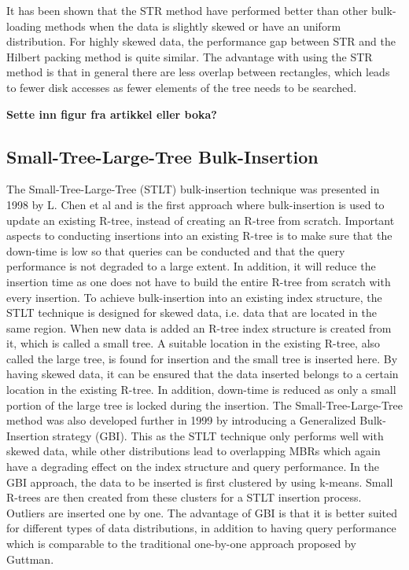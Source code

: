 It has been shown that the STR method have performed better than other bulk-loading methods when the data is slightly skewed or have an uniform distribution. For highly skewed data, the performance gap between STR and the Hilbert packing method is quite similar\cite{STR}. The advantage with using the STR method is that in general there are less overlap between rectangles, which leads to fewer disk accesses as fewer elements of the tree needs to be searched.

\textbf{Sette inn figur fra artikkel eller boka?}

\subsection{Small-Tree-Large-Tree Bulk-Insertion}
The Small-Tree-Large-Tree (STLT) bulk-insertion technique was presented in 1998 by L. Chen et al\cite{STLT} and is the first approach where bulk-insertion is used to update an existing R-tree, instead of creating an R-tree from scratch. Important aspects to conducting insertions into an existing R-tree is to make sure that the down-time is low so that queries can be conducted and that the query performance is not degraded to a large extent. In addition, it will reduce the insertion time as one does not have to build the entire R-tree from scratch with every insertion. To achieve bulk-insertion into an existing index structure, the STLT technique is designed for skewed data, i.e. data that are located in the same region. When new data is added an R-tree index structure is created from it, which is called a small tree. A suitable location in the existing R-tree, also called the large tree, is found for insertion and the small tree is inserted here. By having skewed data, it can be ensured that the data inserted belongs to a certain location in the existing R-tree. In addition, down-time is reduced as only a small portion of the large tree is locked during the insertion. The Small-Tree-Large-Tree method was also developed further in 1999 by introducing a Generalized Bulk-Insertion strategy (GBI)\cite{GBI}. This as the STLT technique only performs well with skewed data, while other distributions lead to overlapping MBRs which again have a degrading effect on the index structure and query performance. In the GBI approach, the data to be inserted is first clustered by using k-means. Small R-trees are then created from these clusters for a STLT insertion process. Outliers are inserted one by one. The advantage of GBI is that it is better suited for different types of data distributions, in addition to having query performance which is comparable to the traditional one-by-one approach proposed by Guttman\cite{r-tree}.

